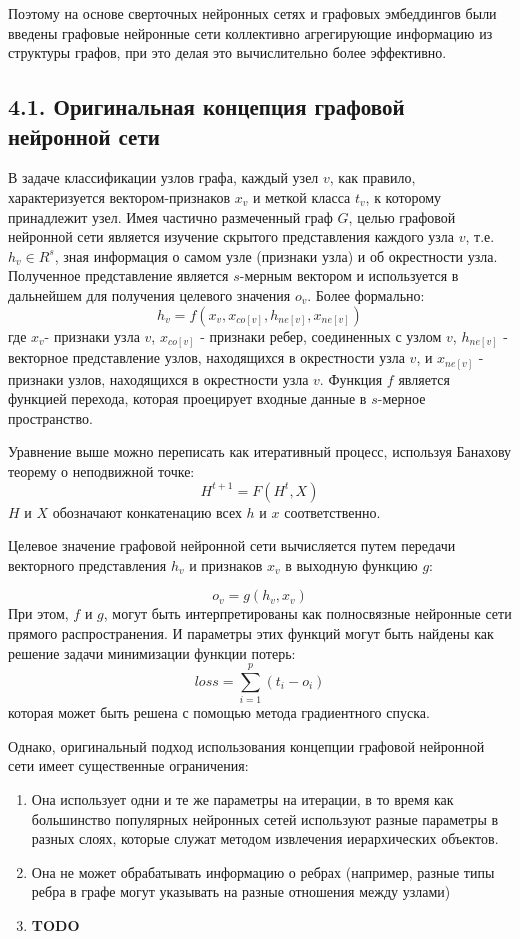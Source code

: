 Поэтому на основе сверточных нейронных сетях и графовых эмбеддингов были введены графовые нейронные сети коллективно агрегирующие информацию из структуры графов, при это делая это вычислительно более эффективно.

\subsection{4.1. Оригинальная концепция графовой нейронной сети}

В задаче классификации узлов графа, каждый узел $v$, как правило, характеризуется вектором-признаков $x_v$ и меткой класса $t_v$, к которому принадлежит узел. Имея частично размеченный граф $G$,
целью графовой нейронной сети является изучение скрытого представления каждого узла $v$, т.е. $h_v \in R^s$, зная информация о самом узле (признаки узла) и об окрестности узла. Полученное представление является $s$-мерным вектором и используется в дальнейшем для получения целевого значения $o_v$.  Более формально:
$$
h_v = f(x_v, x_{co[v]}, h_{ne[v]}, x_{ne[v]}) 
$$
где $x_v$- признаки узла $v$, $x_{co[v]}$ - признаки ребер, соединенных с узлом $v$, $h_{ne[v]}$ - векторное представление узлов, находящихся в окрестности узла $v$, и $x_{ne[v]}$ - признаки узлов, находящихся в окрестности узла $v$.  Функция $f$ является функцией перехода, которая проецирует входные данные в $s$-мерное пространство. 

Уравнение выше можно переписать как итеративный процесс, используя Банахову теорему о неподвижной точке:
$$
H^{t+1} = F(H^t, X)
$$
$H$ и $X$ обозначают конкатенацию всех $h$ и $x$ соответственно.

Целевое значение графовой нейронной сети вычисляется путем передачи векторного представления $h_v$ и признаков $x_v$ в выходную функцию $g$:

$$
o_v = g(h_v, x_v)
$$
При этом, $f$ и $g$, могут быть интерпретированы как полносвязные нейронные сети прямого распространения. И параметры этих функций могут быть найдены как решение задачи минимизации функции потерь:
$$
	loss = \sum_{i=1}^p (t_i - o_i)
$$
которая может быть решена с помощью метода градиентного спуска.

Однако, оригинальный подход использования концепции графовой нейронной сети имеет существенные ограничения:
\begin{enumerate}
\item Она использует одни и те же параметры на итерации, в то время как большинство популярных нейронных сетей используют разные параметры в разных слоях, которые служат методом извлечения иерархических объектов. 
\item Она не может обрабатывать информацию о ребрах (например, разные типы ребра в графе могут указывать на разные отношения между узлами)
\item \textbf{TODO}
\end{enumerate}

